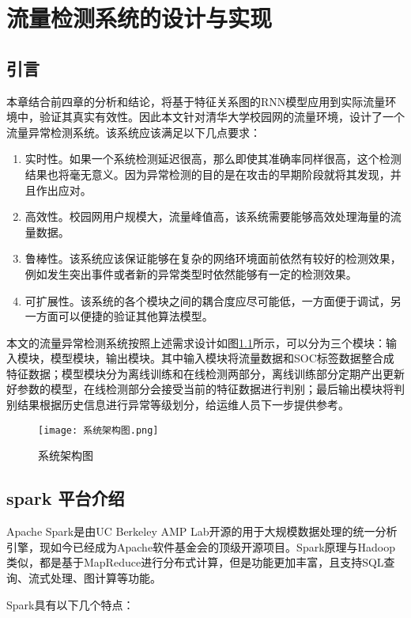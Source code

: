 \chapter{流量检测系统的设计与实现}
\section{引言}
本章结合前四章的分析和结论，将基于特征关系图的RNN模型应用到实际流量环境中，验证其真实有效性。因此本文针对清华大学校园网的流量环境，设计了一个流量异常检测系统。该系统应该满足以下几点要求：
\begin{enumerate}
  \item 实时性。如果一个系统检测延迟很高，那么即使其准确率同样很高，这个检测结果也将毫无意义。因为异常检测的目的是在攻击的早期阶段就将其发现，并且作出应对。
  \item 高效性。校园网用户规模大，流量峰值高，该系统需要能够高效处理海量的流量数据。
  \item 鲁棒性。该系统应该保证能够在复杂的网络环境面前依然有较好的检测效果，例如发生突出事件或者新的异常类型时依然能够有一定的检测效果。
  \item 可扩展性。该系统的各个模块之间的耦合度应尽可能低，一方面便于调试，另一方面可以便捷的验证其他算法模型。
\end{enumerate}

本文的流量异常检测系统按照上述需求设计如图\ref{fig:arch}所示，可以分为三个模块：输入模块，模型模块，输出模块。其中输入模块将流量数据和SOC标签数据整合成特征数据；模型模块分为离线训练和在线检测两部分，离线训练部分定期产出更新好参数的模型，在线检测部分会接受当前的特征数据进行判别；最后输出模块将判别结果根据历史信息进行异常等级划分，给运维人员下一步提供参考。
\begin{figure}
    \centering
    \texttt{[image: 系统架构图.png]}
    \caption{系统架构图}
    \label{fig:arch}
  \end{figure}


\section{spark 平台介绍}
Apache Spark是由UC Berkeley AMP Lab开源的用于大规模数据处理的统一分析引擎\cite{spark}，现如今已经成为Apache软件基金会的顶级开源项目。Spark原理与Hadoop类似，都是基于MapReduce进行分布式计算，但是功能更加丰富，且支持SQL查询、流式处理、图计算等功能。

Spark具有以下几个特点：

